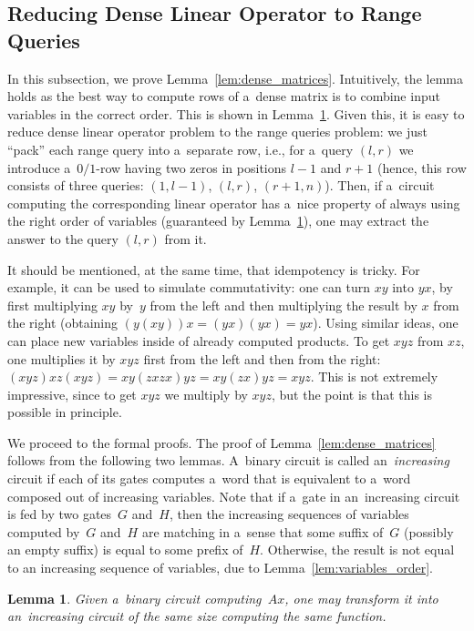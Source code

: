 \documentclass[11pt,letterpaper]{article}
\newtheorem{lemma}{Lemma}
\begin{document}
\subsection{Reducing Dense Linear Operator to Range Queries}
In this subsection, we prove Lemma~\ref{lem:dense_matrices}. Intuitively, the lemma holds as the best way to compute rows of a~dense matrix is to combine input variables in the correct order. This is shown in Lemma~\ref{lemma:correctorder}. Given this, it is easy to reduce dense linear operator problem to the range queries problem: we just ``pack'' each range query into a~separate row, i.e., for a~query $(l,r)$ we introduce a~$0/1$-row having two zeros in positions $l-1$ and $r+1$ (hence, this row consists of three queries: $(1,l-1)$, $(l,r)$, $(r+1,n)$). Then, if a~circuit computing the corresponding linear operator has a~nice property of always using the right order of variables (guaranteed by Lemma~\ref{lemma:correctorder}), one may extract the answer to the query $(l,r)$ from it. 

It should be mentioned, at the same time, that idempotency is tricky. For example, it can be used to simulate commutativity: one can turn $xy$ into $yx$, by first multiplying $xy$ by~$y$ from the left and then multiplying the result by $x$ from the right (obtaining $(y(xy))x=(yx)(yx)=yx$). Using similar ideas, one can place new variables inside of already computed products. To get $xyz$ from $xz$, one multiplies it by $xyz$ first from the left and then from the right: $(xyz)xz(xyz)=xy(zxzx)yz=xy(zx)yz=xyz$.
This is not extremely impressive, since to get $xyz$ we multiply by $xyz$, but the point is that this is possible in principle.

We proceed to the formal proofs. The proof of Lemma~\ref{lem:dense_matrices} follows from the following two lemmas. A~binary circuit is called an~{\em increasing} circuit if each of its gates computes a~word that is equivalent to a~word composed out of increasing variables.
Note that if a~gate in an~increasing circuit is fed by two gates~$G$ and~$H$, then the increasing sequences of variables computed by~$G$ and~$H$ are matching in a~sense that some suffix of~$G$ (possibly an empty suffix) is equal to some prefix of~$H$. Otherwise, the result is not equal to an increasing sequence of variables, due to Lemma~\ref{lem:variables_order}.

\begin{lemma}\label{lemma:correctorder}
Given a~binary circuit computing~$Ax$, one may transform it into an~increasing circuit of the same size computing the same function.
\end{lemma}
\end{document}
